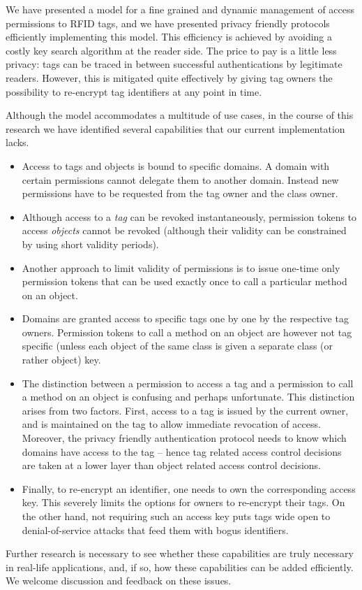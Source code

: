 We have presented a model for a fine grained and dynamic management of access
permissions to RFID tags, and we have presented privacy friendly protocols
efficiently implementing this model. This efficiency is achieved by avoiding a costly key search algorithm at the reader side. The price to pay is a little less privacy: tags can be traced in between successful authentications by legitimate readers. However, this is mitigated quite effectively by giving tag owners the possibility to re-encrypt tag identifiers at any point in time.

Although the model accommodates a multitude
of use cases, in the course of this research we have identified several
capabilities that our current implementation lacks. 
\begin{itemize}
\fixlistspacing
\item Access to tags and objects is bound to specific domains.
  A domain with certain permissions cannot delegate them to another domain.
  Instead new permissions have to be requested from the tag owner and the class
  owner. 

\item Although access to a \emph{tag} can be revoked instantaneously, permission
  tokens to access \emph{objects} cannot be revoked (although their validity
  can be constrained by using short validity periods).

\item Another approach to limit validity of permissions is to issue one-time
  only permission tokens that can be used exactly once to call a particular
  method on an object.

\item Domains are granted access to specific tags one by one by the respective
  tag owners. Permission tokens to call a method on an object are however not
  tag specific (unless each object of the same class is given a separate class
  (or rather object) key.

\item The distinction between a permission to access a tag and a permission to
  call a method on an object is confusing and perhaps unfortunate. 
  This distinction arises from two factors. First, access to a tag is issued by
  the current owner, and is maintained on the tag to allow immediate
  revocation of access. Moreover, the privacy friendly authentication protocol
  needs to know which domains have access to the tag -- hence tag related
  access control decisions are taken at a lower layer than object related
  access control decisions.
\item Finally, to re-encrypt an identifier, one needs to own the corresponding access key. This severely limits the options for owners to re-encrypt their tags. On the other hand, not requiring such an access key puts tags wide open
to denial-of-service attacks that feed them with bogus identifiers.
\end{itemize}
Further research is
necessary to see whether these capabilities are truly necessary in real-life
applications, and, if so, how these capabilities can be added efficiently.
We welcome discussion and feedback on these issues.



